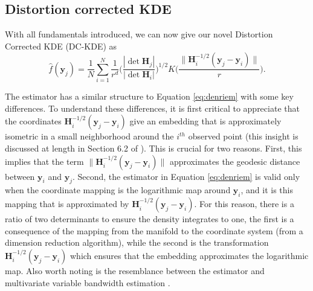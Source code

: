 \documentclass[11pt,a4paper,]{article}
\begin{document}
\hypertarget{DCKDE}{%
\subsection{Distortion corrected KDE}\label{DCKDE}}

With all fundamentals introduced, we can now give our novel Distortion Corrected KDE (DC-KDE) as
\begin{equation}
\label{eq:denestimator}
\hat{f}(\pmb{y}_j) = \frac{1}{N} \sum_{i=1}^{N} \frac{1}{r^d} \bigg(\frac{|\det \pmb{H}_j|}{|\det \pmb{H}_i|} \bigg)^{1/2} K\bigg( \frac{\| \pmb{H}^{-1/2}_i (\pmb{y}_j - \pmb{y}_i)\|}{r} \bigg).
\end{equation}

The estimator has a similar structure to Equation \eqref{eq:denriem} with some key differences. To understand these differences, it is first critical to appreciate that the coordinates \(\pmb{H}^{-1/2}_i (\pmb{y}_j - \pmb{y}_i)\) give an embedding that is approximately isometric in a small neighborhood around the \(i^{th}\) observed point (this insight is discussed at length in Section 6.2 of \textcite{Perrault-Joncas2013-pq}). This is crucial for two reasons. First, this implies that the term \(\| \pmb{H}^{-1/2}_i (\pmb{y}_j - \pmb{y}_i)\|\) approximates the geodesic distance between \(\pmb{y}_i\) and \(\pmb{y}_j\). Second, the estimator in Equation \eqref{eq:denriem} is valid only when the coordinate mapping is the logarithmic map around \(\pmb{y}_i\), and it is this mapping that is approximated by \(\pmb{H}^{-1/2}_i (\pmb{y}_j - \pmb{y}_i)\). For this reason, there is a ratio of two determinants to ensure the density integrates to one, the first is a consequence of the mapping from the manifold to the coordinate system (from a dimension reduction algorithm), while the second is the transformation \(\pmb{H}^{-1/2}_i (\pmb{y}_j - \pmb{y}_i)\) which ensures that the embedding approximates the logarithmic map. Also worth noting is the resemblance between the estimator and multivariate variable bandwidth estimation \autocite{Breiman1977-qc,Jones1990-oe,Terrell1992-ut}.
\end{document}
